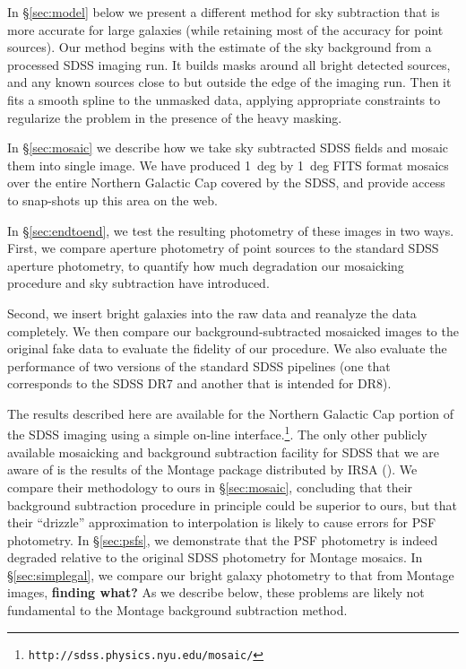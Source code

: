 \documentclass[10pt,preprint]{aastex}
\begin{document}
In \S\ref{sec:model} below we present a different method for sky
subtraction that is more accurate for large galaxies (while retaining
most of the accuracy for point sources). Our method begins with the
estimate of the sky background from a processed SDSS imaging run.  It
builds masks around all bright detected sources, and any known sources
close to but outside the edge of the imaging run. Then it fits a
smooth spline to the unmasked data, applying appropriate constraints
to regularize the problem in the presence of the heavy masking.

In \S\ref{sec:mosaic} we describe how we take sky subtracted SDSS
fields and mosaic them into single image. We have produced 1~deg by
1~deg FITS format mosaics over the entire Northern Galactic Cap
covered by the SDSS, and provide access to snap-shots up this area on
the web.

In \S\ref{sec:endtoend}, we test the resulting photometry of these images
in two ways.  First, we compare aperture photometry of point sources
to the standard SDSS aperture photometry, to quantify how much
degradation our mosaicking procedure and sky subtraction have
introduced.

Second, we insert bright galaxies into the raw data and reanalyze the
data completely.  We then compare our background-subtracted mosaicked
images to the original fake data to evaluate the fidelity of our
procedure. We also evaluate the performance of two versions of the
standard SDSS pipelines (one that corresponds to the SDSS DR7 and
another that is intended for DR8).

The results described here are available for the Northern Galactic Cap
portion of the SDSS imaging using a simple on-line
interface.\footnote{\tt http://sdss.physics.nyu.edu/mosaic/}. 
The only other publicly available mosaicking and background
subtraction facility for SDSS that we are aware of is the results of
the Montage package distributed by IRSA (\citealt{berriman03a}). We
compare their methodology to ours in \S\ref{sec:mosaic}, concluding
that their background subtraction procedure in principle could be
superior to ours, but that their ``drizzle'' approximation to
interpolation is likely to cause errors for PSF photometry. In
\S\ref{sec:psfs}, we demonstrate that the PSF photometry is indeed
degraded relative to the original SDSS photometry for Montage
mosaics. In \S\ref{sec:simplegal}, we compare our bright galaxy
photometry to that from Montage images, {\bf finding what?}  As we
describe below, these problems are likely not fundamental to the
Montage background subtraction method.
\end{document}
